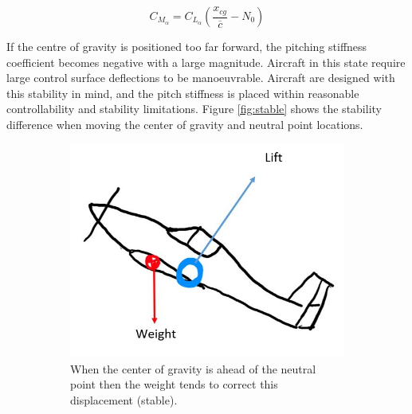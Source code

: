 \begin{equation}
    C_{M_\alpha} = C_{L_\alpha} ( \frac{x_{cg}}{\overline{c}} - N_0 )
    \label{eqn:cm}
\end{equation}

If the centre of gravity is positioned too far forward, the pitching stiffness coefficient becomes negative with a large magnitude. Aircraft in this state require large control surface deflections to be manoeuvrable. Aircraft are designed with this stability in mind, and the pitch stiffness is placed within reasonable controllability and stability limitations. Figure \ref{fig:stable} shows the stability difference when moving the center of gravity and neutral point locations. 


\begin{figure}[H]
     \centering
     \begin{subfigure}[b]{0.45\textwidth}
         \centering
         \includegraphics[width=\textwidth]{02_Background/Figs/a3.JPG}
         \caption{When the center of gravity is ahead of the neutral point then the weight tends to correct this displacement (stable).}
         \label{fig:Pressa2a}
     \end{subfigure}
     \hfill
     \begin{subfigure}[b]{0.45\textwidth}
         \centering

\end{subfigure}
\end{figure}
